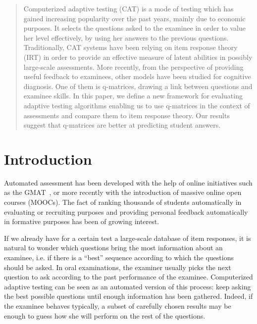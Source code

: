 \documentclass{sig-alternate}
\begin{document}
\maketitle
\begin{abstract}
Computerized adaptive testing (CAT) is a mode of testing which has gained increasing popularity over the past years, mainly due to economic purposes. It selects the questions asked to the examinee in order to value her level effectively, by using her answers to the previous questions.
Traditionally, CAT systems have been relying on item response theory (IRT) in order to provide an effective measure of latent abilities in possibly large-scale assessments.
More recently, from the perspective of providing useful feedback to examinees, other models have been studied for cognitive diagnosis. One of them is q-matrices, drawing a link between questions and examinee skills.
In this paper, we define a new framework for evaluating adaptive testing algorithms enabling us to use q-matrices in the context of assessments and compare them to item response theory.
Our results suggest that q-matrices are better at predicting student answers.
\end{abstract}




\section{Introduction}
Automated assessment has been developed with the help of online initiatives such as the GMAT~\citep{Rudner2010}, or more recently with the introduction of massive online open courses (MOOCs). The fact of ranking thousands of students automatically in evaluating or recruiting purposes and providing personal feedback automatically in formative purposes has been of growing interest.

If we already have for a certain test a large-scale database of item responses, it is natural to wonder which questions bring the most information about an examinee, i.e. if there is a ``best'' sequence according to which the questions should be asked. In oral examinations, the examiner usually picks the next question to ask according to the past performance of the examinee. Computerized adaptive testing can be seen as an automated version of this process: keep asking the best possible questions until enough information has been gathered. Indeed, if the examinee behaves typically, a subset of carefully chosen results may be enough to guess how she will perform on the rest of the questions.
\end{document}
